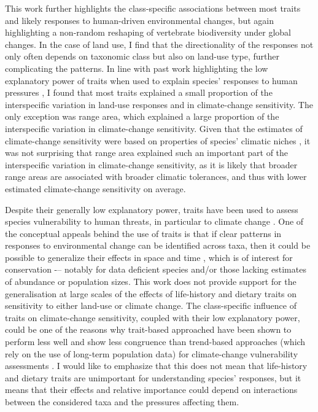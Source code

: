 This work further highlights the class-specific associations between most traits and likely responses to human-driven environmental changes, but again highlighting a non-random reshaping of vertebrate biodiversity under global changes. In the case of land use, I find that the directionality of the responses not only often depends on taxonomic class but also on land-use type, further complicating the patterns. In line with past work highlighting the low explanatory power of traits when used to explain species' responses to human pressures \citep{Angert2011, Verberk2013, Cannistra2021}, I found that most traits explained a small proportion of the interspecific variation in land-use responses and in climate-change sensitivity. The only exception was range area, which explained a large proportion of the interspecific variation in climate-change sensitivity. Given that the estimates of climate-change sensitivity were based on properties of species' climatic niches \citep{Rinnan2019}, it was not surprising that range area explained such an important part of the interspecific variation in climate-change sensitivity, as it is likely that broader range areas are associated with broader climatic tolerances, and thus with lower estimated climate-change sensitivity on average.

Despite their generally low explanatory power, traits have been used to assess species vulnerability to human threats, in particular to climate change \citep{Foden2013, Bohm2016}. One of the conceptual appeals behind the use of traits is that if clear patterns in responses to environmental change can be identified across taxa, then it could be possible to generalize their effects in space and time \citep{Verberk2013, Hamilton2020}, which is of interest for conservation -– notably for data deficient species and/or those lacking estimates of abundance or population sizes. This work does not provide support for the generalisation at large scales of the effects of life-history and dietary traits on sensitivity to either land-use or climate change. The class-specific influence of traits on climate-change sensitivity, coupled with their low explanatory power, could be one of the reasons why trait-based approached have been shown to perform less well and show less congruence than trend-based approaches (which rely on the use of long-term population data) for climate-change vulnerability assessments \citep{Wheatley2017}. I would like to emphasize that this does not mean that life-history and dietary traits are unimportant for understanding species' responses, but it means that their effects and relative importance could depend on interactions between the considered taxa and the pressures affecting them.  

